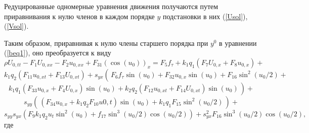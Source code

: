Редуцированные одномерные уравнения движения получаются путем приравнивания к нулю членов в каждом порядке $y$ подстановки в них (\ref{Usol}), (\ref{Vsol}).

Таким образом, приравнивая к нулю члены старшего порядка при $y^0$ в уравнении (\ref {beq1}), оно преобразуется к виду
\[
\rho U_{0,tt}-F_1 U_{0,xx}-F_2 u_{0,xx}+F_{31} ( \cos(u_0))_x= F_5 f_\tau+k_1 q_1 (F_7 U_{0,x}+F_8 u_{0,x})+
\]
\[
k_1 q_2 (F_{11} u_{0,xt}+ F_{13} U_{0,xt})+s_{yx}\left(\frac{}{} F_6 f_\tau \sin (u_0)+F_{32} u_{0,x} \sin (u_0)+F_{16} \sin^2(u_0/2)+\right.
\]
\[
\left. k_1 q_1 (F_{33} u_{0,x}+F_4 U_{0,x})\sin(u_0)+k_2 q_2(F_{12} u_{0,xt}+F_{14} U_{0,xt})\sin(u_0) \frac{}{}\right)+
\]
\[
s_{yy}\left(\frac{}{} (F_{34} u_{0,x}+ k_1 q_2 F_{10} u{0,t})\sin(u_0)+k_1 q_1 F_{15}\sin^2(u_0/2)\frac{}{}\right)+
\]
\begin{equation}
	s_{yy} s_{yx} (F_9 k_1 q_2 u_t \sin^2(u_0)+f_{17} \sin^3(u_0/2)\cos(u_0/2))+s_{yx}^2 F_{16}  \sin^3(u_0/2)\cos(u_0/2) , \label{goveq1}
\end{equation}
где
